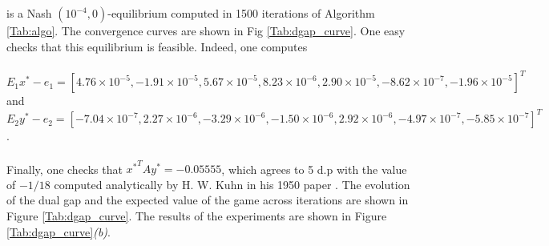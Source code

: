 \documentclass[a4paper,9pt]{extarticle}
\begin{document}
is a Nash $(10^{-4},0)$-equilibrium computed in 1500 iterations of
Algorithm  \ref{Tab:algo}. The convergence curves are shown
in Fig \ref{Tab:dgap_curve}. One easy checks that this equilibrium is
feasible. Indeed, one computes \\\\
$E_1x^* - e_1 = [4.76 \times 10^{-5}, -1.91 \times 10^{-5}, 5.67
      \times 10^{-5}, 8.23 \times 10^{-6}, 2.90 \times 10^{-5},
      -8.62 \times 10^{-7}, -1.96 \times 10^{-5}]^T$
and
$E_2y^* - e_2 = [-7.04 \times 10^{-7}, 2.27 \times 10^{-6}, -3.29
  \times 10^{-6}, -1.50 \times 10^{-6},
      2.92 \times 10^{-6}, -4.97 \times 10^{-7}, -5.85 \times
      10^{-7}]^T$.\\\\
Finally, one checks that ${x^*}^TAy^* = {-0.05555}$,
 which agrees to 5 d.p with the value of $-1 / 18$ computed
 analytically by H. W. Kuhn in his 1950 paper \cite{kuhn}. The
 evolution of the dual gap and the expected value of
 the game across iterations are shown in Figure \ref{Tab:dgap_curve}.
The results of the experiments are shown in Figure
\ref{Tab:dgap_curve}\textit{(b)}.
\end{document}
